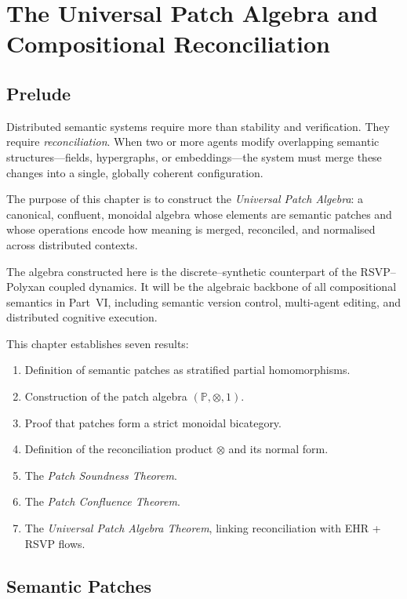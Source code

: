 \chapter{The Universal Patch Algebra and Compositional Reconciliation}
\label{ch:universal-patch-algebra}

\section*{Prelude}

Distributed semantic systems require more than stability and verification.
They require \emph{reconciliation}.  
When two or more agents modify overlapping semantic structures—fields, hypergraphs,
or embeddings—the system must merge these changes into a single, globally coherent configuration.

The purpose of this chapter is to construct the \emph{Universal Patch Algebra}:
a canonical, confluent, monoidal algebra whose elements are semantic patches and whose
operations encode how meaning is merged, reconciled, and normalised across distributed
contexts.

The algebra constructed here is the discrete--synthetic counterpart of the RSVP--Polyxan
coupled dynamics.  
It will be the algebraic backbone of all compositional semantics in Part~VI, including
semantic version control, multi-agent editing, and distributed cognitive execution.

\bigskip

This chapter establishes seven results:

\begin{enumerate}
\item Definition of semantic patches as stratified partial homomorphisms.
\item Construction of the patch algebra $(\mathbb{P},\otimes,1)$.
\item Proof that patches form a strict monoidal bicategory.
\item Definition of the reconciliation product $\otimes$ and its normal form.
\item The \emph{Patch Soundness Theorem}.
\item The \emph{Patch Confluence Theorem}.
\item The \emph{Universal Patch Algebra Theorem}, linking reconciliation with EHR + RSVP flows.
\end{enumerate}

\section{Semantic Patches}

